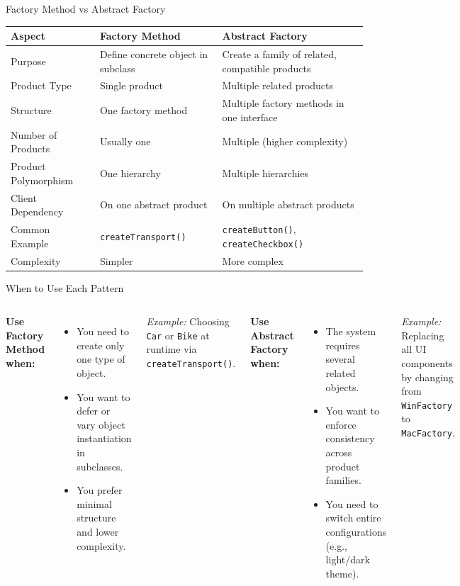 \documentclass[aspectratio=169, table]{beamer}
\begin{document}
\begin{frame}[fragile]{Factory Method vs Abstract Factory}
	\vspace{20pt}
	\centering
	\scriptsize
	
	\setlength{\arrayrulewidth}{0.5pt} %
	\begin{tabular}{|p{}|p{}|p{}|}
		\hline
		\rowcolor{gray!20} 
		\textbf{Aspect} & \textbf{Factory Method} & \textbf{Abstract Factory} \\
		\hline
		Purpose & Define concrete object in subclass & Create a family of related, compatible products \\
		\hline
		Product Type & Single product & Multiple related products \\
		\hline
		Structure & One factory method & Multiple factory methods in one interface \\
		\hline
		Number of Products & Usually one & Multiple (higher complexity) \\
		\hline
		Product Polymorphism & One hierarchy & Multiple hierarchies \\
		\hline
		Client Dependency & On one abstract product & On multiple abstract products \\
		\hline
		Common Example & \texttt{createTransport()} & \texttt{createButton()}, \texttt{createCheckbox()} \\
		\hline
		Complexity & Simpler & More complex \\
		\hline
	\end{tabular}
\end{frame}


\begin{frame}[fragile]{When to Use Each Pattern}
	\vspace{20pt}
	\begin{columns}[T]
		\textbf{Use Factory Method when:}
		\begin{itemize}
			\item You need to create only one type of object.
			\item You want to defer or vary object instantiation in subclasses.
			\item You prefer minimal structure and lower complexity.
		\end{itemize}
		\textit{Example:} Choosing \texttt{Car} or \texttt{Bike} at runtime via \texttt{createTransport()}.
		
		\textbf{Use Abstract Factory when:}
		\begin{itemize}
			\item The system requires several related objects.
			\item You want to enforce consistency across product families.
			\item You need to switch entire configurations (e.g., light/dark theme).
		\end{itemize}
		\textit{Example:} Replacing all UI components by changing from \texttt{WinFactory} to \texttt{MacFactory}.
	\end{columns}
\end{frame}
\end{document}
